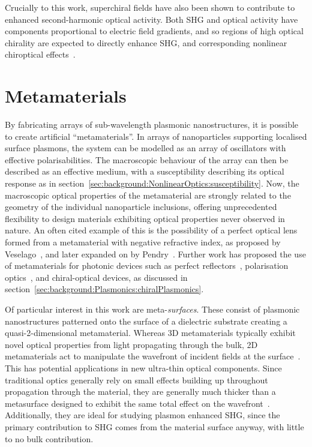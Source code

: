 Crucially to this work, superchiral fields have also been shown to contribute to enhanced second-harmonic optical activity. Both SHG and optical activity have components proportional to electric field gradients, and so regions of high optical chirality are expected to directly enhance SHG, and corresponding nonlinear chiroptical effects~\cite{Valev2014}.

\section{Metamaterials}\label{sec:background:Plasmonics:Metamaterials}
By fabricating arrays of sub-wavelength plasmonic nanostructures, it is possible to create artificial ``metamaterials''. In arrays of nanoparticles supporting localised surface plasmons, the system can be modelled as an array of oscillators with effective polarisabilities. The macroscopic behaviour of the array can then be described as an effective medium, with a susceptibility describing its optical response as in section~\ref{sec:background:NonlinearOptics:susceptibility}. Now, the macroscopic optical properties of the metamaterial are strongly related to the geometry of the individual nanoparticle inclusions, offering unprecedented flexibility to design materials exhibiting optical properties never observed in nature. An often cited example of this is the possibility of a perfect optical lens formed from a metamaterial with negative refractive index, as proposed by Veselago~\cite{Veselago1968}, and later expanded on by Pendry~\cite{Pendry2000}. Further work has proposed the use of metamaterials for photonic devices such as perfect reflectors~\cite{Moitra2015}, polarisation optics~\cite{Cong2015}, and chiral-optical devices, as discussed in section~\ref{sec:background:Plasmonics:chiralPlasmonics}.

Of particular interest in this work are meta-\textit{surfaces}. These consist of plasmonic nanostructures patterned onto the surface of a dielectric substrate creating a quasi-2-dimensional metamaterial. Whereas 3D metamaterials typically exhibit novel optical properties from light propagating through the bulk, 2D metamaterials act to manipulate the wavefront of incident fields at the surface~\cite{Meinzer2014}. This has potential applications in new ultra-thin optical components. Since traditional optics generally rely on small effects building up throughout propagation through the material, they are generally much thicker than a metasurface designed to exhibit the same total effect on the wavefront~\cite[\S 3]{Yao2014}. Additionally, they are ideal for studying plasmon enhanced SHG, since the primary contribution to SHG comes from the material surface anyway, with little to no bulk contribution. 

